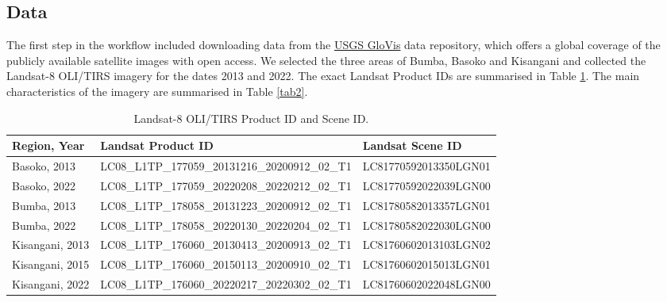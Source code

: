 \documentclass[applsci,article,accept,pdftex,moreauthors]{Definitions/mdpi}
\begin{document}
\subsection{Data}

The first step in the workflow included downloading data from the \href{https://glovis.usgs.gov/app}{USGS GloVis} data repository, which offers a global coverage of the publicly available satellite images with open access. We selected the three areas of Bumba, Basoko and Kisangani and collected the Landsat-8 OLI/TIRS imagery for the dates 2013 and 2022. The exact Landsat Product IDs are summarised in Table \ref{tab1}. The main characteristics of the imagery are summarised in Table \ref{tab2}. 
\begin{table}[H] 
\caption{Landsat-8 OLI/TIRS Product ID and Scene ID. \label{tab1}}
	\begin{tabularx}{\textwidth}{p{2.3cm}p{6.3cm}p{5.3cm}}
\toprule
\textbf{Region, Year} & \textbf{Landsat Product ID} & \textbf{Landsat Scene ID}\\
\midrule
	Basoko, 2013 & LC08\_L1TP\_177059\_20131216\_20200912\_02\_T1 & LC81770592013350LGN01\\
	Basoko, 2022 & LC08\_L1TP\_177059\_20220208\_20220212\_02\_T1 & LC81770592022039LGN00 \\
	Bumba, 2013 & LC08\_L1TP\_178058\_20131223\_20200912\_02\_T1 & LC81780582013357LGN01 \\
	Bumba, 2022 & LC08\_L1TP\_178058\_20220130\_20220204\_02\_T1 & LC81780582022030LGN00 \\
	Kisangani, 2013 & LC08\_L1TP\_176060\_20130413\_20200913\_02\_T1 & LC81760602013103LGN02 \\
	Kisangani, 2015 & LC08\_L1TP\_176060\_20150113\_20200910\_02\_T1 & LC81760602015013LGN01 \\
	Kisangani, 2022 & LC08\_L1TP\_176060\_20220217\_20220302\_02\_T1 & LC81760602022048LGN00 \\
\bottomrule
\end{tabularx}
\end{table}
\end{document}
